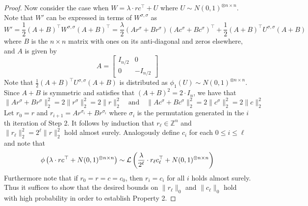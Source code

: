 \documentclass[11pt]{article}
\begin{document}
\begin{proof}
Now consider the case when $W = \lambda \cdot r c^\top + U$ where $U \sim N(0, 1)^{\otimes n \times n}$. Note that $W'$ can be expressed in terms of $W^{\sigma, \sigma}$ as
$$W' = \frac{1}{2} \left( A + B \right)^\top W^{\sigma, \sigma} \left( A + B \right)^\top = \frac{\lambda}{2} \left( A r^\sigma + B r^\sigma \right) \left( Ac^\sigma + Bc^\sigma \right)^\top + \frac{1}{2} \left( A + B \right)^\top U^{\sigma, \sigma} \left( A + B \right)$$
where $B$ is the $n \times n$ matrix with ones on its anti-diagonal and zeros elsewhere, and $A$ is given by
$$A = \left[ \begin{matrix} I_{n/2} & 0 \\ 0 & -I_{n/2} \end{matrix} \right]$$
Note that $\frac{1}{2} \left( A + B \right)^\top U^{\sigma, \sigma} \left( A + B \right)$ is distributed as $\phi_1(U) \sim N(0, 1)^{\otimes n \times n}$. Since $A + B$ is symmetric and satisfies that $(A + B)^2 = 2 \cdot I_n$, we have that
$$\| Ar^\sigma + Br^\sigma \|_2^2 = 2 \| r^\sigma \|_2^2 = 2\| r \|_2^2 \quad \text{and} \quad \| Ac^\sigma + Bc^\sigma \|_2^2 = 2 \| c^\sigma \|_2^2 = 2\| c \|_2^2$$
Let $r_0 = r$ and $r_{i+1} = A r^{\sigma_i} + B r^{\sigma_i}$ where $\sigma_i$ is the permutation generated in the $i$th iteration of Step 2. It follows by induction that $r_\ell \in \mathbb{Z}^n$ and $\| r_\ell \|_2^2 = 2^\ell \| r \|_2^2$ hold almost surely. Analogously define $c_i$ for each $0 \le i \le \ell$ and note that
$$\phi\left(\lambda \cdot r c^\top + N(0, 1)^{\otimes n \times n}\right) \sim \mathcal{L}\left( \frac{\lambda}{2^\ell} \cdot r_\ell c_\ell^\top + N(0, 1)^{\otimes n \times n}\right)$$
Furthermore note that if $r_0 = r = c = c_0$, then $r_i = c_i$ for all $i$ holds almost surely. Thus it suffices to show that the desired bounds on $\| r_\ell \|_0$ and $\| c_\ell \|_0$ hold with high probability in order to establish Property 2.


\end{proof}
\end{document}
